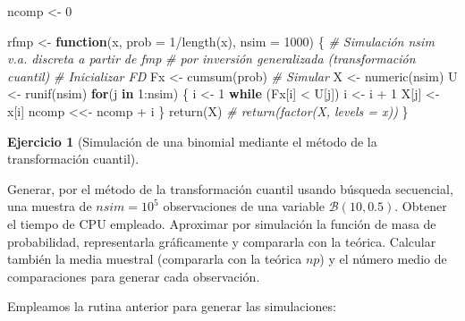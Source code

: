 \documentclass[
]{book}
\newenvironment{Shaded}{\begin{snugshade}}{\end{snugshade}}
\newcommand{\AttributeTok}[1]{\textcolor[rgb]{0.77,0.63,0.00}{#1}}
\newcommand{\CommentTok}[1]{\textcolor[rgb]{0.56,0.35,0.01}{\textit{#1}}}
\newcommand{\ControlFlowTok}[1]{\textcolor[rgb]{0.13,0.29,0.53}{\textbf{#1}}}
\newcommand{\DecValTok}[1]{\textcolor[rgb]{0.00,0.00,0.81}{#1}}
\newcommand{\FunctionTok}[1]{\textcolor[rgb]{0.00,0.00,0.00}{#1}}
\newcommand{\NormalTok}[1]{#1}
\newcommand{\OtherTok}[1]{\textcolor[rgb]{0.56,0.35,0.01}{#1}}
\newcommand{\SpecialCharTok}[1]{\textcolor[rgb]{0.00,0.00,0.00}{#1}}
\theoremstyle{break}
\theoremstyle{definition}
\theoremstyle{definition}
\theoremstyle{definition}
\newtheorem{exercise}{Ejercicio}[chapter]
\theoremstyle{definition}
\theoremstyle{remark}
\begin{document}
\begin{Shaded}
\begin{Highlighting}[]
\NormalTok{ncomp }\OtherTok{\textless{}{-}} \DecValTok{0}

\NormalTok{rfmp }\OtherTok{\textless{}{-}} \ControlFlowTok{function}\NormalTok{(x, }\AttributeTok{prob =} \DecValTok{1}\SpecialCharTok{/}\FunctionTok{length}\NormalTok{(x), }\AttributeTok{nsim =} \DecValTok{1000}\NormalTok{) \{}
  \CommentTok{\# Simulación nsim v.a. discreta a partir de fmp}
  \CommentTok{\# por inversión generalizada (transformación cuantil)}
  \CommentTok{\# Inicializar FD}
\NormalTok{  Fx }\OtherTok{\textless{}{-}} \FunctionTok{cumsum}\NormalTok{(prob)}
  \CommentTok{\# Simular}
\NormalTok{  X }\OtherTok{\textless{}{-}} \FunctionTok{numeric}\NormalTok{(nsim)}
\NormalTok{  U }\OtherTok{\textless{}{-}} \FunctionTok{runif}\NormalTok{(nsim)}
  \ControlFlowTok{for}\NormalTok{(j }\ControlFlowTok{in} \DecValTok{1}\SpecialCharTok{:}\NormalTok{nsim) \{}
\NormalTok{    i }\OtherTok{\textless{}{-}} \DecValTok{1}
    \ControlFlowTok{while}\NormalTok{ (Fx[i] }\SpecialCharTok{\textless{}}\NormalTok{ U[j]) i }\OtherTok{\textless{}{-}}\NormalTok{ i }\SpecialCharTok{+} \DecValTok{1}
\NormalTok{    X[j] }\OtherTok{\textless{}{-}}\NormalTok{ x[i]}
\NormalTok{    ncomp }\OtherTok{\textless{}\textless{}{-}}\NormalTok{ ncomp }\SpecialCharTok{+}\NormalTok{ i}
\NormalTok{  \}}
  \FunctionTok{return}\NormalTok{(X)}
  \CommentTok{\# return(factor(X, levels = x))}
\NormalTok{\}}
\end{Highlighting}
\end{Shaded}

\begin{exercise}[Simulación de una binomial mediante el método de la transformación cuantil]
\protect\hypertarget{exr:binom-cuant}{}{\label{exr:binom-cuant} {} }
\end{exercise}

Generar, por el método de la transformación cuantil usando
búsqueda secuencial, una muestra de \(nsim=10^{5}\) observaciones
de una variable \(\mathcal{B}(10,0.5)\).
Obtener el tiempo de CPU empleado. Aproximar
por simulación la función de masa de probabilidad, representarla
gráficamente y compararla con la teórica. Calcular también la
media muestral (compararla con la teórica \(np\)) y el número
medio de comparaciones para generar cada observación.

Empleamos la rutina anterior para generar las simulaciones:
\end{document}
